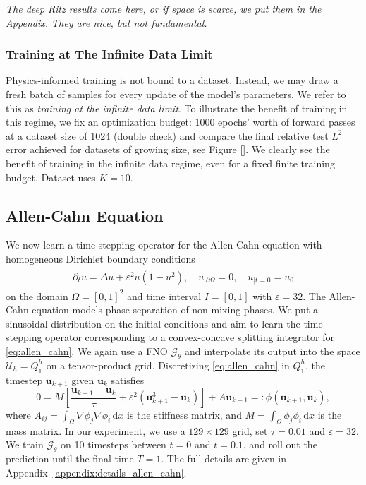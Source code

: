 \documentclass{article} %
\begin{document}
\emph{The deep Ritz results come here, or if space is scarce, we put them in the Appendix. They are nice, but not fundamental.}

\subsubsection{Training at The Infinite Data Limit}
Physics-informed training is not bound to a dataset. Instead, we may draw a fresh batch of samples for every update of the model's parameters. We refer to this as \emph{training at the infinite data limit}. To illustrate the benefit of training in this regime, we fix an optimization budget: 1000 epochs' worth of forward passes at a dataset size of 1024 (double check) and compare the final relative test $L^2$ error achieved for datasets of growing size, see Figure []. We clearly see the benefit of training in the infinite data regime, even for a fixed finite training budget. Dataset uses $K=10$.

\subsection{Allen-Cahn Equation}
We now learn a time-stepping operator for the Allen-Cahn equation with homogeneous Dirichlet boundary conditions
\begin{align}\label{eq:allen_cahn}
   \begin{split}
      \partial_t u = \Delta u + \varepsilon^2 u(1-u^2), \quad u_{|\partial\Omega}=0, \quad u_{|t=0} = u_0
   \end{split}
\end{align}
on the domain $\Omega=[0,1]^2$ and time interval $I=[0,1]$ with $\varepsilon=32$. The Allen-Cahn equation models phase separation of non-mixing phases. We put a sinusoidal distribution on the initial conditions and aim to learn the time stepping operator corresponding to a convex-concave splitting integrator for \eqref{eq:allen_cahn}. We again use a FNO $\mathcal G_\theta$ and interpolate its output into the space $\mathcal U_h = Q_1^h$ on a tensor-product grid. Discretizing \eqref{eq:allen_cahn} in $Q_1^h$, the timestep $\mathbf u_{k+1}$ given $\mathbf u_k$ satisfies
\begin{equation}\label{eq:convex_concave_time_stepper}
   0 
   =
   M\left[ \frac{\mathbf u_{k+1} - \mathbf u_k}{\tau} + \varepsilon^2\left( \mathbf u_{k+1}^3 - \mathbf u_k \right) \right]
   +
   A \mathbf u_{k+1}
   =:
   \phi(\mathbf u_{k+1}, \mathbf u_k), 
\end{equation}
where $A_{ij}=\int_\Omega \nabla \phi_j\nabla \phi_i\,\mathrm dx$ is the stiffness matrix, and $M=\int_\Omega \phi_j \phi_i\,\mathrm dx$ is the mass matrix. In our experiment, we use a $129\times129$ grid, set $\tau=0.01$ and $\varepsilon=32$. We train $\mathcal G_\theta$ on 10 timesteps between $t=0$ and $t=0.1$, and roll out the prediction until the final time $T=1$. The full details are given in Appendix~\ref{appendix:details_allen_cahn}.
\end{document}
